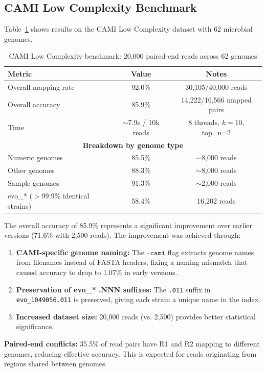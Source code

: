 \documentclass{article}
\begin{document}
\subsection{CAMI Low Complexity Benchmark}

Table~\ref{tab:cami} shows results on the CAMI Low Complexity dataset with 62 microbial genomes.

\begin{table}[H]
\centering
\caption{CAMI Low Complexity benchmark: 20,000 paired-end reads across 62 genomes}
\label{tab:cami}
\begin{tabular}{lcc}
\toprule
\textbf{Metric} & \textbf{Value} & \textbf{Notes} \\
\midrule
Overall mapping rate & 92.0\% & 30,105/40,000 reads \\
Overall accuracy & 85.9\% & 14,222/16,566 mapped pairs \\
Time & $\sim$7.9s / 10k reads & 8 threads, $k=10$, top\_n=2 \\
\midrule
\multicolumn{3}{c}{\textbf{Breakdown by genome type}} \\
\midrule
Numeric genomes & 85.5\% & $\sim$8,000 reads \\
Other genomes & 88.3\% & $\sim$8,000 reads \\
Sample\* genomes & 91.3\% & $\sim$2,000 reads \\
evo\_* ($>$99.9\% identical strains) & 58.4\% & 16,202 reads \\
\bottomrule
\end{tabular}
\end{table}

The overall accuracy of 85.9\% represents a significant improvement over earlier versions (71.6\% with 2,500 reads). The improvement was achieved through:
\begin{enumerate}
    \item \textbf{CAMI-specific genome naming:} The $\texttt{--cami}$ flag extracts genome names from filenames instead of FASTA headers, fixing a naming mismatch that caused accuracy to drop to 1.07\% in early versions.
    \item \textbf{Preservation of evo\_* .NNN suffixes:} The \texttt{.011} suffix in \texttt{evo\_1049056.011} is preserved, giving each strain a unique name in the index.
    \item \textbf{Increased dataset size:} 20,000 reads (vs. 2,500) provides better statistical significance.
\end{enumerate}

\textbf{Paired-end conflicts:} 35.5\% of read pairs have R1 and R2 mapping to different genomes, reducing effective accuracy. This is expected for reads originating from regions shared between genomes.
\end{document}
